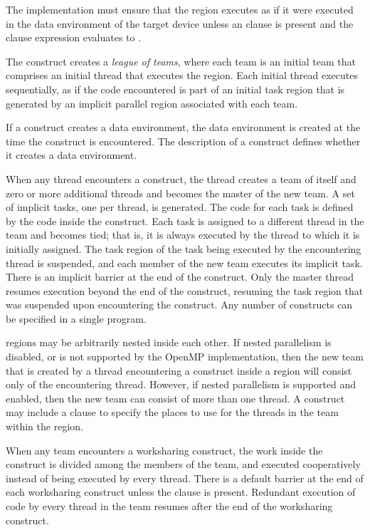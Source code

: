 The implementation must ensure that the  region executes as 
if it were executed in the data environment of the target device unless 
an  clause is present and the  clause expression 
evaluates to .

The  construct creates a \emph{league of teams}, where each team
is an initial team that comprises an initial thread that executes the
 region. Each initial thread executes sequentially, as if the
code encountered is part of an initial task region that is generated by an
implicit parallel region associated with each team.

If a construct creates a data environment, the data environment is created 
at the time the construct is encountered. The description of a construct 
defines whether it creates a data environment.


When any thread encounters a  construct, the thread creates 
a team of itself and zero or more additional threads and becomes the master 
of the new team. A set of implicit tasks, one per thread, is generated. The 
code for each task is defined by the code inside the  construct. 
Each task is assigned to a different thread in the team and becomes tied; that 
is, it is always executed by the thread to which it is initially assigned. The 
task region of the task being executed by the encountering thread is suspended, 
and each member of the new team executes its implicit task. There is an implicit 
barrier at the end of the  construct. Only the master thread resumes
execution beyond the end of the  construct, resuming the task 
region that was suspended upon encountering the  construct. Any 
number of  constructs can be specified in a single program.

 regions may be arbitrarily nested inside each other. If nested 
parallelism is disabled, or is not supported by the OpenMP implementation, then 
the new team that is created by a thread encountering a  construct 
inside a  region will consist only of the encountering thread. 
However, if nested parallelism is supported and enabled, then the new team can 
consist of more than one thread. A  construct may include a 
 clause to specify the places to use for the threads
in the team within the  region.

When any team encounters a worksharing construct, the work inside the construct is
divided among the members of the team, and executed cooperatively instead of being
executed by every thread. There is a default barrier at the end of each worksharing
construct unless the  clause is present. Redundant execution of code 
by every thread in the team resumes after the end of the worksharing construct.

